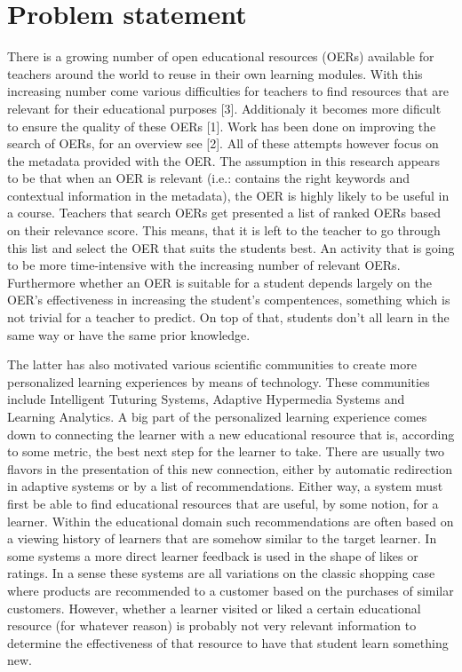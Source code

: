 \section{Problem statement}
There is a growing number of open educational resources (OERs) available for teachers around the world to reuse in their own learning modules. With this increasing number come various difficulties for teachers to find resources that are relevant for their educational purposes [3]. Additionaly it becomes more dificult to ensure the quality of these OERs [1]. Work has been done on improving the search of OERs, for an overview see [2]. All of these attempts however focus on the metadata provided with the OER. The assumption in this research appears to be that when an OER is relevant (i.e.: contains the right keywords and contextual information in the metadata), the OER is highly likely to be useful in a course. Teachers that search OERs get presented a list of ranked OERs based on their relevance score. This means, that it is left to the teacher to go through this list and select the OER that suits the students best. An activity that is going to be more time-intensive with the increasing number of relevant OERs. Furthermore whether an OER is suitable for a student depends largely on the OER’s effectiveness in increasing the student’s compentences, something which is not trivial for a teacher to predict. On top of that, students don’t all learn in the same way or have the same prior knowledge.

The latter has also motivated various scientific communities to create more personalized learning experiences by means of technology. These communities include Intelligent Tuturing Systems, Adaptive Hypermedia Systems and Learning Analytics. A big part of the personalized learning experience comes down to connecting the learner with a new educational resource that is, according to some metric, the best next step for the learner to take. There are usually two flavors in the presentation of this new connection, either by automatic redirection in adaptive systems or by a list of recommendations. Either way, a system must first be able to find educational resources that are useful, by some notion, for a learner. Within the educational domain such recommendations are often based on a viewing history of learners that are somehow similar to the target learner. In some systems a more direct learner feedback is used in the shape of likes or ratings. In a sense these systems are all variations on the classic shopping case where products are recommended to a customer based on the purchases of similar customers. However, whether a learner visited or liked a certain educational resource (for whatever reason) is probably not very relevant information to determine the effectiveness of that resource to have that student learn something new.

